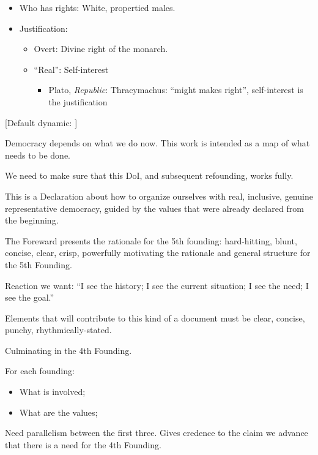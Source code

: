 \documentclass[
]{book}
\providecommand{\tightlist}{%
  \setlength{\itemsep}{0pt}\setlength{\parskip}{0pt}}
\begin{document}
\begin{itemize}
\tightlist
\item
  Who has rights: White, propertied males.
\item
  Justification:

  \begin{itemize}
  \tightlist
  \item
    Overt: Divine right of the monarch.
  \item
    ``Real'': Self-interest

    \begin{itemize}
    \tightlist
    \item
      Plato, \emph{Republic}: Thracymachus: ``might makes right'', self-interest is the justification
    \end{itemize}
  \end{itemize}
\end{itemize}

{[}Default dynamic: {]}

Democracy depends on what we do now. This work is intended as a map of what needs to be done.

We need to make sure that this DoI, and subsequent refounding, works fully.

This is a Declaration about how to organize ourselves with real, inclusive, genuine representative democracy, guided by the values that were already declared from the beginning.

The Foreward presents the rationale for the 5th founding: hard-hitting, blunt, concise, clear, crisp, powerfully motivating the rationale and general structure for the 5th Founding.

Reaction we want: ``I see the history; I see the current situation; I see the need; I see the goal.''

Elements that will contribute to this kind of a document must be clear, concise, punchy, rhythmically-stated.

Culminating in the 4th Founding.

For each founding:

\begin{itemize}
\tightlist
\item
  What is involved;
\item
  What are the values;
\end{itemize}

Need parallelism between the first three. Gives credence to the claim we advance that there is a need for the 4th Founding.
\end{document}
